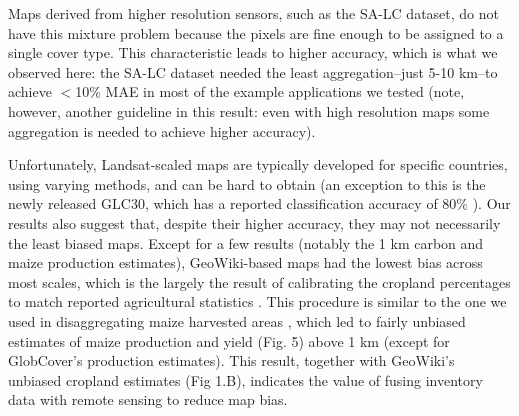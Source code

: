 \documentclass{pnastwo}
\begin{document}
\begin{article}
Maps derived from higher resolution sensors, such as the SA-LC dataset, do not have this mixture problem because the pixels are fine enough to be assigned to a single cover type. This characteristic leads to higher accuracy, which is what we observed here: the SA-LC dataset needed the least aggregation--just 5-10 km--to achieve $<$10\% MAE in most of the example applications we tested (note, however, another guideline in this result: even with high resolution maps some aggregation is needed to achieve higher accuracy).


Unfortunately, Landsat-scaled maps are typically developed for specific countries, using varying methods, and can be hard to obtain (an exception to this is the newly released GLC30, which has a reported classification accuracy of 80\% \cite{chen_global_2015}). Our results also suggest that, despite their higher accuracy, they may not necessarily the least biased maps. Except for a few results (notably the 1 km carbon and maize production estimates), GeoWiki-based maps had the lowest bias across most scales, which is the largely the result of calibrating the cropland percentages to match reported agricultural statistics \cite{fritz_cropland_2011,fritz_mapping_2015}. This procedure is similar to the one we used in disaggregating maize harvested areas \cite{ramankutty_farming_2008, monfreda_farming_2008}, which led to fairly unbiased estimates of maize production and yield (Fig. 5) above 1 km (except for GlobCover's production estimates). This result, together with GeoWiki's unbiased cropland estimates (Fig 1.B), indicates the value of fusing inventory data with remote sensing to reduce map bias. 



\end{article}
\end{document}

